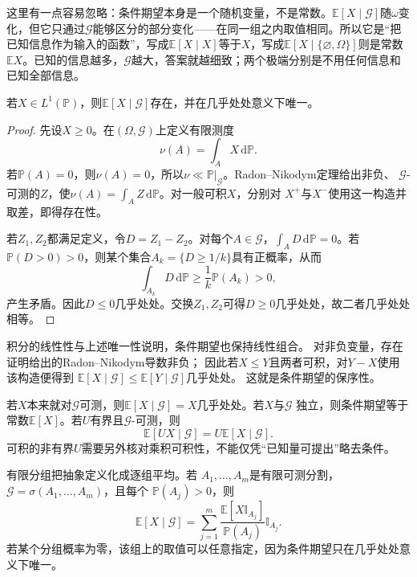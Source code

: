 这里有一点容易忽略：条件期望本身是一个随机变量，不是常数。\(\mathbb E[X\mid\mathcal G]\)随\(\omega\)变化，但它只通过\(\mathcal G\)能够区分的部分变化——在同一组之内取值相同。所以它是“把已知信息作为输入的函数”，写成\(\mathbb E[X\mid X]\)等于\(X\)，写成\(\mathbb E[X\mid \{\varnothing,\Omega\}]\)则是常数\(\mathbb E X\)。已知的信息越多，\(\mathcal G\)越大，答案就越细致；两个极端分别是不用任何信息和已知全部信息。

\begin{theorem}[条件期望的存在与唯一性]
\label{thm:probability-conditional-expectation-existence}
若\(X\in L^1(\mathbb{P})\)，则\(\mathbb{E}[X\mid\mathcal{G}]\)存在，并在几乎处处意义下唯一。
\end{theorem}

\begin{proof}
先设\(X\geq0\)。在\((\Omega,\mathcal{G})\)上定义有限测度
\[ \nu(A)=\int_A X\,\mathrm{d}\mathbb{P}. \]
若\(\mathbb{P}(A)=0\)，则\(\nu(A)=0\)，所以\(\nu\ll\mathbb{P}|_{\mathcal{G}}\)。Radon--Nikodym定理给出非负、
\(\mathcal{G}\)-可测的\(Z\)，使\(\nu(A)=\int_A Z\,\mathrm{d}\mathbb{P}\)。对一般可积\(X\)，分别对
\(X^+\)与\(X^-\)使用这一构造并取差，即得存在性。

若\(Z_1,Z_2\)都满足定义，令\(D=Z_1-Z_2\)。对每个\(A\in\mathcal{G}\)，\(\int_A D\,\mathrm{d}\mathbb{P}=0\)。若
\(\mathbb{P}(D>0)>0\)，则某个集合\(A_k=\{D\geq1/k\}\)具有正概率，从而
\[ \int_{A_k}D\,\mathrm{d}\mathbb{P}
  \geq\frac{1}{k}\mathbb{P}(A_k)>0, \]
产生矛盾。因此\(D\leq0\)几乎处处。交换\(Z_1,Z_2\)可得\(D\geq0\)几乎处处，故二者几乎处处相等。
\end{proof}

积分的线性性与上述唯一性说明，条件期望也保持线性组合。
对非负变量，存在证明给出的Radon--Nikodym导数非负；
因此若\(X\leq Y\)且两者可积，对\(Y-X\)使用该构造便得到
\(\mathbb E[X\mid\mathcal G]\leq\mathbb E[Y\mid\mathcal G]\)几乎处处。
这就是条件期望的保序性。

若\(X\)本来就对\(\mathcal{G}\)可测，则\(\mathbb{E}[X\mid\mathcal{G}]=X\)几乎处处。若\(X\)与\(\mathcal{G}\)
独立，则条件期望等于常数\(\mathbb{E}[X]\)。若\(U\)有界且\(\mathcal{G}\)-可测，则
\begin{equation}
  \mathbb{E}[UX\mid\mathcal{G}]
  =
  U\mathbb{E}[X\mid\mathcal{G}].
  \label{eq:probability-taking-out-known-factor}
\end{equation}
可积的非有界\(U\)需要另外核对乘积可积性，不能仅凭“已知量可提出”略去条件。

有限分组把抽象定义化成逐组平均。若
\(A_1,\ldots,A_m\)是有限可测分割，
\(\mathcal{G}=\sigma(A_1,\ldots,A_m)\)，且每个
\(\mathbb{P}(A_j)>0\)，则
\begin{equation}
  \mathbb{E}[X\mid\mathcal{G}]
  =
  \sum_{j=1}^{m}
  \frac{\mathbb{E}[X\mathbb{I}_{A_j}]}
       {\mathbb{P}(A_j)}
  \mathbb{I}_{A_j}.
  \label{eq:probability-finite-partition-conditional-expectation}
\end{equation}
若某个分组概率为零，该组上的取值可以任意指定，因为条件期望只在几乎处处意义下唯一。

